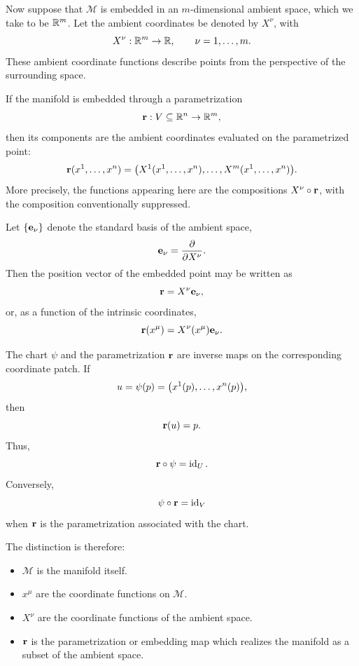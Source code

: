 		Now suppose that $\mathcal M$ is embedded in an $m$-dimensional
		ambient space, which we take to be $\mathbb{R}^m$. Let the ambient coordinates
		be denoted by $X^\nu$, with
		\[
			X^\nu:\mathbb{R}^m\to\mathbb{R},
			\qquad
			\nu=1,\ldots,m.
		\]
		These ambient coordinate functions describe points from the perspective
		of the surrounding space.

		If the manifold is embedded through a parametrization
		\[
			\vb{r}:V\subseteq\mathbb{R}^n\to\mathbb{R}^m,
		\]
		then its components are the ambient coordinates evaluated on the
		parametrized point:
		\[
			\vb{r}(x^1,\ldots,x^n)
			=
			\bigl(
				X^1(x^1,\ldots,x^n),
				\ldots,
				X^m(x^1,\ldots,x^n)
			\bigr).
		\]
		More precisely, the functions appearing here are the compositions
		$X^\nu\circ\vb r$, with the composition conventionally suppressed.

		Let $\{\vb e_\nu\}$ denote the standard basis of the ambient space,
		\[
			\vb e_\nu=\pdv{}{X^\nu}.
		\]
		Then the position vector of the embedded point may be written as
		\[
			\vb r
			=
			X^\nu\vb e_\nu,
		\]
		or, as a function of the intrinsic coordinates,
		\[
			\vb r(x^\mu)
			=
			X^\nu(x^\mu)\vb e_\nu.
		\]

		The chart $\psi$ and the parametrization $\vb r$ are inverse maps on
		the corresponding coordinate patch. If
		\[
			u=\psi(p)
			=
			\pqty{x^1(p),\ldots,x^n(p)},
		\]
		then
		\[
			\vb r(u)=p.
		\]
		Thus,
		\[
			\vb r\circ\psi=\operatorname{id}_U.
		\]
		Conversely,
		\[
			\psi\circ\vb r=\operatorname{id}_{V}
		\]
		when $\vb r$ is the parametrization associated with the chart.

		The distinction is therefore:
		\begin{itemize}
			\item $\mathcal M$ is the manifold itself.
			\item $x^\mu$ are the coordinate functions on $\mathcal M$.
			\item $X^\nu$ are the coordinate functions of the ambient space.
			\item $\vb r$ is the parametrization or embedding map which
			      realizes the manifold as a subset of the ambient space.
		\end{itemize}

